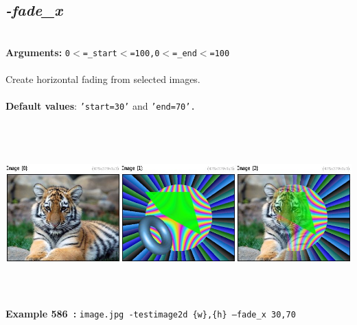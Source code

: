 \documentclass[a4paper,11pt,twoside]{book}
\begin{document}
\subsection{\emph{-fade\_x} }\vspace*{-0.5em}
~\\\textbf{Arguments: } 
{\small \texttt{0$<$=\_start$<$=100,0$<$=\_end$<$=100}}\\~\\
Create horizontal fading from selected images.
~\\~\\\textbf{Default values}: {\small \texttt{'start=30'} and \texttt{'end=70'.}}
\begin{center}\includegraphics[keepaspectratio=true,height=7cm,width=\textwidth]{img/gmic_def586.jpg}\\
{\footnotesize \textbf{Example 586~:} \texttt{image.jpg -testimage2d \{w\},\{h\} --fade\_x 30,70}}
\end{center}
\end{document}
